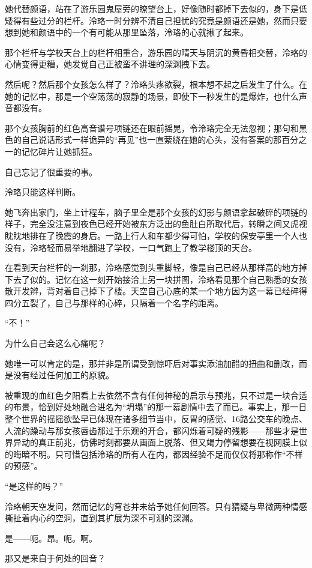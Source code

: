 \documentclass[UTF8, scheme = chinese, openany]{ctexbook}
\begin{document}
她代替颜语，站在了游乐园鬼屋旁的瞭望台上，好像随时都掉下去似的，身下是低矮得有些过分的栏杆。泠珞一时分辨不清自己担忧的究竟是颜语还是她，然而只要想到她和颜语中的一个有可能从那里坠落，泠珞的心就揪了起来。

那个栏杆与学校天台上的栏杆相重合，游乐园的晴天与阴沉的黄昏相交替，泠珞的心情变得更糟，她发觉自己正被蛮不讲理的深渊拽下去。

然后呢？然后那个女孩怎么样了？泠珞头疼欲裂，根本想不起之后发生了什么。在她的记忆中，那是一个空荡荡的寂静的场景，即使下一秒发生的是爆炸，也什么声音都没有。

那个女孩胸前的红色高音谱号项链还在眼前摇晃，令泠珞完全无法忽视；那句和黑色的自己说话形式一样诡异的“再见”也一直萦绕在她的心头，没有答案的那百分之一的记忆碎片让她抓狂。

自己忘记了很重要的事。

泠珞只能这样判断。

她飞奔出家门，坐上计程车，脑子里全是那个女孩的幻影与颜语拿起破碎的项链的样子，完全没注意到夜色已经开始被东方泛出的鱼肚白所取代后，转瞬之间又虎视眈眈地排在了晚霞的身后。一路上行人和车都少得可怕，学校的保安亭里一个人也没有，泠珞轻而易举地翻进了学校，一口气跑上了教学楼顶的天台。

在看到天台栏杆的一刹那，泠珞感觉到头重脚轻，像是自己已经从那样高的地方掉下去了似的。记忆在这一刻开始接洽上另一块拼图，泠珞看见那个自己熟悉的女孩散开发辫，背对着自己掉下了楼。天空自己心底的某一个地方因为这一幕已经碎得四分五裂了，自己与那样的心碎，只隔着一个名字的距离。

“不！”

为什么自己会这么心痛呢？

她唯一可以肯定的是，那并非是所谓受到惊吓后对事实添油加醋的扭曲和删改，而是没有经过任何加工的原貌。

被重现的血红色夕阳看上去依然不含有任何神秘的启示与预兆，只不过是一块合适的布景，恰到好处地融合进名为“坍塌”的那一幕剧情中去了而已。事实上，那一日整个世界的摇摇欲坠早已体现在诸多细节当中，反胃的感觉、16路公交车的晚点、人流的躁动与那女孩唇齿那过于乐观的开合，都闪烁着可疑的残影——那些才是世界异动的真正前兆，仿佛时刻都要从画面上脱落、但又竭力停留想要在视网膜上似的晦暗不明。只可惜包括泠珞的所有人在内，都因经验不足而仅仅将那称作“不祥的预感”。

“是这样的吗？”

泠珞朝天空发问，然而记忆的穹苍并未给予她任何回答。只有猜疑与卑微两种情感撕扯着内心的空洞，直到其扩展为深不可测的深渊。

是——呃。昂。呃。啊。

那又是来自于何处的回音？
\end{document}
